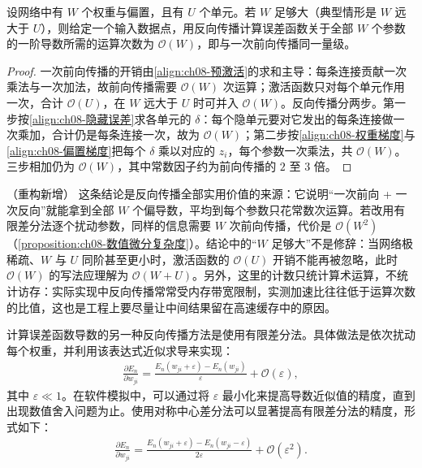\documentclass[../../main.tex]{subfiles}
\begin{document}
\begin{proposition}[反向传播的计算复杂度]\label{proposition:ch08-反向传播复杂度}
设网络中有 $W$ 个权重与偏置，且有 $U$ 个单元。若 $W$ 足够大（典型情形是 $W$ 远大于 $U$），则给定一个输入数据点，用反向传播计算误差函数关于全部 $W$ 个参数的一阶导数所需的运算次数为 $\mathcal{O}(W)$，即与一次前向传播同一量级。
\end{proposition}

\begin{proof}
一次前向传播的开销由\eqref{align:ch08-预激活}的求和主导：每条连接贡献一次乘法与一次加法，故前向传播需要 $\mathcal{O}(W)$ 次运算；激活函数只对每个单元作用一次，合计 $\mathcal{O}(U)$，在 $W$ 远大于 $U$ 时可并入 $\mathcal{O}(W)$。反向传播分两步。第一步按\eqref{align:ch08-隐藏误差}求各单元的 $\delta$：每个隐单元要对它发出的每条连接做一次乘加，合计仍是每条连接一次，故为 $\mathcal{O}(W)$；第二步按\eqref{align:ch08-权重梯度}与\eqref{align:ch08-偏置梯度}把每个 $\delta$ 乘以对应的 $z_i$，每个参数一次乘法，共 $\mathcal{O}(W)$。三步相加仍为 $\mathcal{O}(W)$，其中常数因子约为前向传播的 $2$ 至 $3$ 倍。
\end{proof}

\begin{remark}（重构新增）
\enlargethispage{2\baselineskip}
这条结论是反向传播全部实用价值的来源：它说明“一次前向 + 一次反向”就能拿到全部 $W$ 个偏导数，平均到每个参数只花常数次运算。若改用有限差分法逐个扰动参数，同样的信息需要 $W$ 次前向传播，代价是 $\mathcal{O}(W^{2})$（\cref{proposition:ch08-数值微分复杂度}）。结论中的“$W$ 足够大”不是修辞：当网络极稀疏、$W$ 与 $U$ 同阶甚至更小时，激活函数的 $\mathcal{O}(U)$ 开销不能再被忽略，此时 $\mathcal{O}(W)$ 的写法应理解为 $\mathcal{O}(W+U)$。另外，这里的计数只统计算术运算，不统计访存：实际实现中反向传播常常受内存带宽限制，实测加速比往往低于运算次数的比值，这也是工程上要尽量让中间结果留在高速缓存中的原因。
\end{remark}

计算误差函数导数的另一种反向传播方法是使用有限差分法。具体做法是依次扰动每个权重，并利用该表达式近似求导来实现：
\begin{align}
\frac{\partial E_n}{\partial w_{ji}}=\frac{E_n\left(w_{ji}+\varepsilon\right)-E_n\left(w_{ji}\right)}{\varepsilon}+\mathcal{O}(\varepsilon),
\label{align:ch08-有限差分}
\end{align}
其中 $\varepsilon\ll1$。在软件模拟中，可以通过将 $\varepsilon$ 最小化来提高导数近似值的精度，直到出现数值舍入问题为止。使用对称中心差分法可以显著提高有限差分法的精度，形式如下：
\begin{align}
\frac{\partial E_n}{\partial w_{ji}}=\frac{E_n\left(w_{ji}+\varepsilon\right)-E_n\left(w_{ji}-\varepsilon\right)}{2\varepsilon}+\mathcal{O}\left(\varepsilon^{2}\right).
\label{align:ch08-中心差分}
\end{align}
\end{document}
